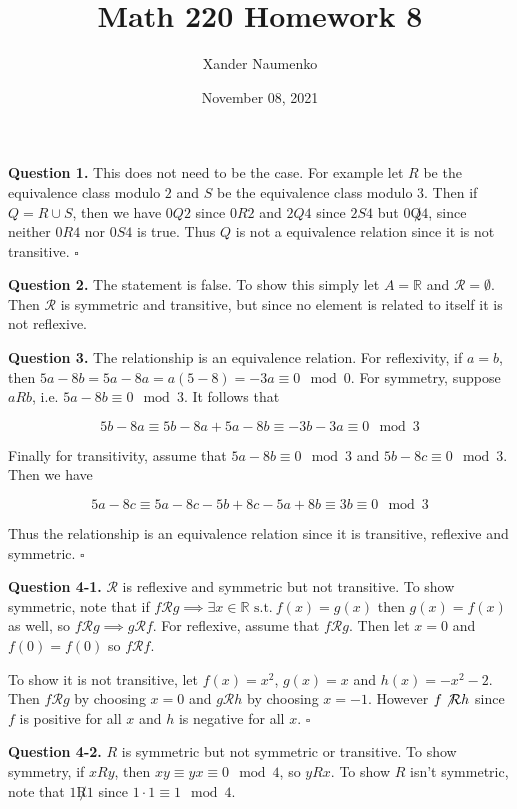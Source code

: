 \documentclass[letterpaper, reqno,11pt]{article}
\newcommand{\RR}{\mathbb{R}}
\newcommand{\st}{\text{ s.t.}\ }
\begin{document}
\title{Math 220 Homework 8}
\date{November 08, 2021}
\author{Xander Naumenko}
\maketitle

{\noindent\bf Question 1.} This does not need to be the case. For example let $R$ be the equivalence class modulo $2$ and $S$ be the equivalence class modulo $3$. Then if $Q=R\cup S$, then we have $0Q2$ since $0R2$ and $2Q4$ since $2S4$ but $0\not Q4$, since neither $0R4$ nor $0S4$ is true. Thus $Q$ is not a equivalence relation since it is not transitive. $\square$

{\noindent\bf Question 2.} The statement is false. To show this simply let $A=\RR$ and $\mathcal{R}=\emptyset$. Then $\mathcal{R}$ is symmetric and transitive, but since no element is related to itself it is not reflexive. 

{\noindent\bf Question 3.} The relationship is an equivalence relation. For reflexivity, if $a=b$, then $5a-8b=5a-8a=a(5-8)=-3a\equiv 0\mod0$. For symmetry, suppose $aRb$, i.e. $5a-8b\equiv0\mod3$. It follows that 

\[
    5b-8a\equiv 5b-8a+5a-8b\equiv-3b-3a\equiv 0\mod3
\]

Finally for transitivity, assume that $5a-8b\equiv 0\mod3$ and $5b-8c\equiv 0\mod3$. Then we have 

\[
    5a-8c\equiv 5a-8c-5b+8c-5a+8b\equiv3b\equiv0\mod3   
\]

Thus the relationship is an equivalence relation since it is transitive, reflexive and symmetric. $\square$

{\noindent\bf Question 4-1.} $\mathcal{R}$ is reflexive and symmetric but not transitive. To show symmetric, note that if $f\mathcal{R}g\implies\exists x\in\RR\st f(x)=g(x)$ then $g(x)=f(x)$ as well, so $f\mathcal{R}g\implies g\mathcal{R}f$. For reflexive, assume that $f\mathcal{R}g$. Then let $x=0$ and $f(0)=f(0)$ so $f\mathcal{R}f$. 

To show it is not transitive, let $f(x)=x^2$, $g(x)=x$ and $h(x)=-x^2-2$. Then $f\mathcal{R}g$ by choosing $x=0$ and $g\mathcal{R}h$ by choosing $x=-1$. However $f\not\mathcal{R}h$ since $f$ is positive for all $x$ and $h$ is negative for all $x$. $\square$

{\noindent\bf Question 4-2.} $R$ is symmetric but not symmetric or transitive. To show symmetry, if $xRy$, then $xy\equiv yx\equiv 0\mod4$, so $yRx$. To show $R$ isn't symmetric, note that $1\not R1$ since $1\cdot 1\equiv 1\mod4$. 
\end{document}

